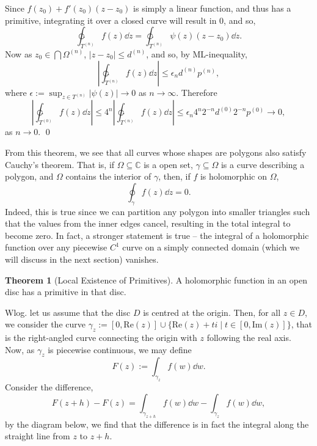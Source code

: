 \documentclass[
]{article}
\theoremstyle{definition}
\newtheorem{theorem}{Theorem}
\theoremstyle{definition}
\begin{document}
Since \(f(z_0) + f'(z_0)(z - z_0)\) is simply a linear function, and
thus has a primitive, integrating it over a closed curve will result in
0, and so,
\[\ointctrclockwise_{T^{(n)}} f(z) \dd z = \ointctrclockwise_{T^{(n)}}\psi(z)(z - z_0) \dd z.\]
Now as \(z_0 \in \bigcap \Omega^{(n)}\), \(|z - z_0| \le d^{(n)}\), and
so, by ML-inequality,
\[\left| \ointctrclockwise_{T^{(n)}} f(z) \dd z \right| \le \epsilon_n d^{(n)}p^{(n)},\]
where \(\epsilon := \sup_{z \in T^{(n)}}|\psi(z)| \to 0\) as
\(n \to \infty\). Therefore
\[\left|\ointctrclockwise_{T^{(0)}} f(z) \dd z\right| 
  \le 4^n\left|\ointctrclockwise_{T^{(n)}} f(z) \dd z\right|
  \le \epsilon_n 4^n 2^{-n}d^{(0)} 2^{-n}p^{(0)} \to 0,\] as
\(n \to 0\). \qed

From this theorem, we see that all curves whose shapes are polygons also
satisfy Cauchy's theorem. That is, if \(\Omega \subseteq \mathbb{C}\) is
a open set, \(\gamma \subseteq \Omega\) is a curve describing a polygon,
and \(\Omega\) contains the interior of \(\gamma\), then, if \(f\) is
holomorphic on \(\Omega\), \[\oint_\gamma f(z) \dd z = 0.\] Indeed, this
is true since we can partition any polygon into smaller triangles such
that the values from the inner edges cancel, resulting in the total
integral to become zero. In fact, a stronger statement is true -- the
integral of a holomorphic function over any piecewise \(C^1\) curve on a
simply connected domain (which we will discuss in the next section)
vanishes.

\begin{theorem}[Local Existence of Primitives]
  A holomorphic function in an open disc has a primitive in that disc.
\end{theorem}
\proof

Wlog. let us assume that the disc \(D\) is centred at the origin. Then,
for all \(z \in D\), we consider the curve
\(\gamma_z :=  [0, \text{Re}(z)] \cup \{\text{Re}(z) + ti \mid t \in [0, \text{Im}(z)] \}\),
that is the right-angled curve connecting the origin with \(z\)
following the real axis. Now, as \(\gamma_z\) is piecewise continuous,
we may define \[F(z) := \int_{\gamma_z} f(w) \dd w.\] Consider the
difference,
\[F(z + h) - F(z) = \int_{\gamma_{z + h}} f(w) \dd w - \int_{\gamma_z} f(w) \dd w,\]
by the diagram below, we find that the difference is in fact the
integral along the straight line from \(z\) to \(z + h\).
\end{document}
